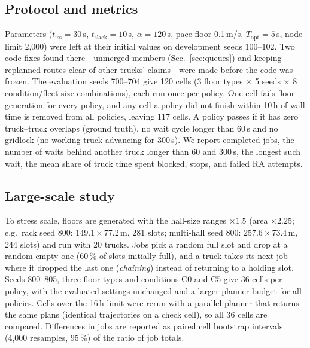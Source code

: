 \documentclass[conference]{IEEEtran}
\begin{document}
\subsection{Protocol and metrics}
Parameters ($t_{\mathrm{iss}}=30$\,s, $t_{\mathrm{slack}}=10$\,s,
$\alpha=120$\,s, pace floor 0.1\,m/s, $T_{\mathrm{opt}}=5$\,s, node limit
2{,}000) were left at their initial values on development seeds 100--102. Two
code fixes found there---unmerged members (Sec.~\ref{sec:queues}) and keeping
replanned routes clear of other trucks' claims---were made before the code was
frozen. The evaluation seeds 700--704 give 120 cells (3 floor types
$\times$ 5 seeds $\times$ 8 condition/fleet-size combinations), each run once
per policy. One cell fails floor generation for every policy, and any cell a
policy did not finish within 10\,h of wall time is removed from all policies,
leaving 117 cells. A policy passes if it has zero truck--truck overlaps (ground
truth), no wait cycle longer than 60\,s and no gridlock (no working truck
advancing for 300\,s). We report completed jobs, the number of waits behind
another truck longer than 60 and 300\,s, the longest such wait, the mean share
of truck time spent blocked, stops, and failed RA attempts.

\subsection{Large-scale study}
To stress scale, floors are generated with the hall-size ranges $\times1.5$
(area $\times2.25$; e.g.\ rack seed 800: $149.1\times77.2$\,m, 281 slots;
multi-hall seed 800: $257.6\times73.4$\,m, 244 slots) and run with 20 trucks.
Jobs pick a random full slot and drop at a random empty one (60\,\% of slots
initially full), and a truck takes its next job where it dropped the last one
(\emph{chaining}) instead of returning to a holding slot. Seeds 800--805, three
floor types and conditions C0 and C5 give 36 cells per policy, with the
evaluated settings unchanged and a larger planner budget for all policies.
Cells over the 16\,h limit were rerun with a parallel planner that returns the
same plans (identical trajectories on a check cell), so all 36 cells are
compared. Differences in jobs are reported as paired cell bootstrap intervals
(4{,}000 resamples, 95\,\%) of the ratio of job totals.

\end{document}
